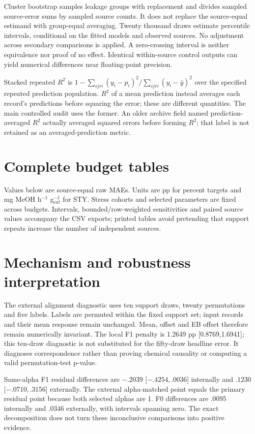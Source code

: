 \documentclass[11pt]{article}
\begin{document}
Cluster bootstrap samples leakage groups with replacement and divides sampled source-error sums by sampled source counts. It does not replace the source-equal estimand with group-equal averaging. Twenty thousand draws estimate percentile intervals, conditional on the fitted models and observed sources. No adjustment across secondary comparisons is applied. A zero-crossing interval is neither equivalence nor proof of no effect. Identical within-source control outputs can yield numerical differences near floating-point precision.

Stacked repeated $R^2$ is $1-\sum_{sjri}(y_i-p_i)^2/\sum_{sjri}(y_i-\bar y)^2$ over the specified repeated prediction population. $R^2$ of a mean prediction instead averages each record's predictions before squaring the error; these are different quantities. The main controlled audit uses the former. An older archive field named prediction-averaged $R^2$ actually averaged squared errors before forming $R^2$; that label is not retained as an averaged-prediction metric.

\section{Complete budget tables}
Values below are source-equal raw MAEs. Units are pp for percent targets and mg MeOH h$^{-1}$ g$_{cat}^{-1}$ for STY. Stress cohorts and selected parameters are fixed across budgets. Intervals, bounded/row-weighted sensitivities and paired source values accompany the CSV exports; printed tables avoid pretending that support repeats increase the number of independent sources.


\section{Mechanism and robustness interpretation}
The external alignment diagnostic uses ten support draws, twenty permutations and five labels. Labels are permuted within the fixed support set; input records and their mean response remain unchanged. Mean, offset and EB offset therefore remain numerically invariant. The local F1 penalty is 1.2649 pp [0.8769,1.6941]; this ten-draw diagnostic is not substituted for the fifty-draw headline error. It diagnoses correspondence rather than proving chemical causality or computing a valid permutation-test p-value.

Same-alpha F1 residual differences are $-.2039$ [$-.4254,.0036$] internally and $.1230$ [$-.0710,.3156$] externally. The external alpha-matched point equals the primary residual point because both selected alphas are 1. F0 differences are .0095 internally and .0346 externally, with intervals spanning zero. The exact decomposition does not turn these inconclusive comparisons into positive evidence.
\end{document}
